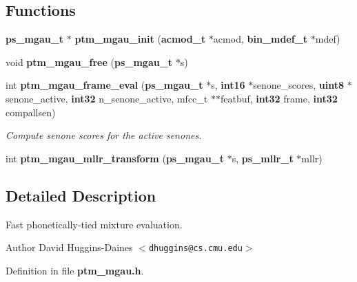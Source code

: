 \subsection*{\-Functions}
\begin{DoxyCompactItemize}
\item 
{\bf ps\-\_\-mgau\-\_\-t} $\ast$ {\bfseries ptm\-\_\-mgau\-\_\-init} ({\bf acmod\-\_\-t} $\ast$acmod, {\bf bin\-\_\-mdef\-\_\-t} $\ast$mdef)\label{ptm__mgau_8h_a712679ca84e5b9f7351d969abbe1021a}

\item 
void {\bfseries ptm\-\_\-mgau\-\_\-free} ({\bf ps\-\_\-mgau\-\_\-t} $\ast$s)\label{ptm__mgau_8h_ac202aeb266594ab9c98294a73e16f00a}

\item 
int {\bf ptm\-\_\-mgau\-\_\-frame\-\_\-eval} ({\bf ps\-\_\-mgau\-\_\-t} $\ast$s, {\bf int16} $\ast$senone\-\_\-scores, {\bf uint8} $\ast$senone\-\_\-active, {\bf int32} n\-\_\-senone\-\_\-active, mfcc\-\_\-t $\ast$$\ast$featbuf, {\bf int32} frame, {\bf int32} compallsen)\label{ptm__mgau_8h_ae9fb76ef388e6541bd6c1b20fe8bc094}

\begin{DoxyCompactList}\small\item\em \-Compute senone scores for the active senones. \end{DoxyCompactList}\item 
int {\bfseries ptm\-\_\-mgau\-\_\-mllr\-\_\-transform} ({\bf ps\-\_\-mgau\-\_\-t} $\ast$s, {\bf ps\-\_\-mllr\-\_\-t} $\ast$mllr)\label{ptm__mgau_8h_ad619b68c9db5e2fed688f62ea4468c4e}

\end{DoxyCompactItemize}


\subsection{\-Detailed \-Description}
\-Fast phonetically-\/tied mixture evaluation. \begin{DoxyAuthor}{\-Author}
\-David \-Huggins-\/\-Daines $<${\tt dhuggins@cs.\-cmu.\-edu}$>$ 
\end{DoxyAuthor}


\-Definition in file {\bf ptm\-\_\-mgau.\-h}.

